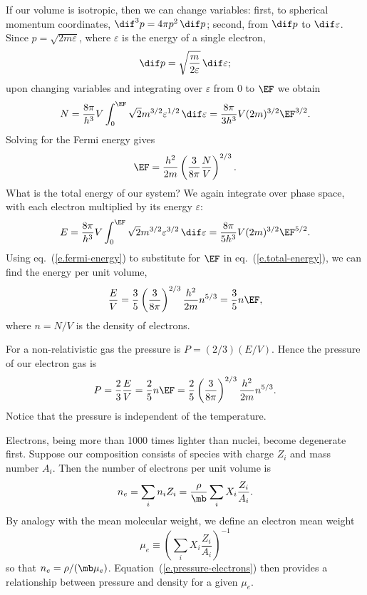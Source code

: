 If our volume is isotropic, then we can change variables: first, to spherical momentum coordinates, $\dif^{3}p = 4\pi p^{2}\,\dif p$; second, from $\dif p$ to $\dif\varepsilon$.  Since $p = \sqrt{2m\varepsilon}$, where $\varepsilon$ is the energy of a single electron,
\[
	\dif p = \sqrt{\frac{m}{2\varepsilon}}\,\dif \varepsilon;
\]
upon changing variables and integrating over $\varepsilon$ from $0$ to $\EF$ we obtain
\[
	N = \frac{8\pi}{h^{3}}V \int_{0}^{\EF} \sqrt{2}m^{3/2}\varepsilon^{1/2}\,\dif \varepsilon
	= \frac{8\pi}{3h^{3}} V (2m)^{3/2} \EF^{3/2}.
\]
Solving for the Fermi energy gives
\begin{equation}\label{e.fermi-energy}
	\EF = \frac{h^{2}}{2m}\left(\frac{3}{8\pi}\frac{N}{V}\right)^{2/3}.
\end{equation}
What is the total energy of our system? We again integrate over phase space, with each electron multiplied by its energy $\varepsilon$:
\begin{equation}\label{e.total-energy}
	E = \frac{8\pi}{h^{3}}V\int_{0}^{\EF}\sqrt{2}m^{3/2}\varepsilon^{3/2}\,\dif\varepsilon = \frac{8\pi}{5h^{3}}V(2m)^{3/2} \EF^{5/2}.
\end{equation}
Using eq.~(\ref{e.fermi-energy}) to substitute for $\EF$ in eq.~(\ref{e.total-energy}), we can find the energy per unit volume,
\[
	\frac{E}{V} = \frac{3}{5}\left(\frac{3}{8\pi}\right)^{2/3}\frac{h^{2}}{2m}n^{5/3} = \frac{3}{5} n \EF,
\]
where $n=N/V$ is the density of electrons.

For a non-relativistic gas the pressure is $P = (2/3)(E/V)$.  Hence the pressure of our electron gas is
\begin{equation}\label{e.pressure-electrons}
	P = \frac{2}{3}\frac{E}{V} = \frac{2}{5} n\EF
		= \frac{2}{5}\left(\frac{3}{8\pi}\right)^{2/3}\frac{h^{2}}{2m}n^{5/3}.
\end{equation}
Notice that the pressure is independent of the temperature.

Electrons, being more than 1000 times lighter than nuclei, become degenerate first. Suppose our composition consists of species with charge $Z_{i}$ and mass number $A_{i}$. Then the number of electrons per unit volume is
\[
	n_{e} = \sum_{i} n_{i} Z_{i} = \frac{\rho}{\mb}\sum_{i} X_{i}\frac{Z_{i}}{A_{i}}.
\]
By analogy with the mean molecular weight, we define an electron mean weight
\begin{equation}\label{e.electron-mean-weight}
\mu_{e} \equiv \left(\sum_{i}X_{i}\frac{Z_{i}}{A_{i}}\right)^{-1}
\end{equation}
so that $n_{e} = \rho/(\mb\mu_{e})$. Equation~(\ref{e.pressure-electrons}) then provides a relationship between pressure and density for a given $\mu_{e}$.

